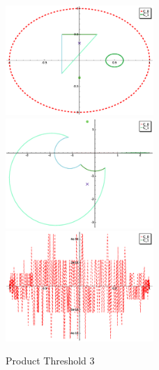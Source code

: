 \documentclass[a4paper,10pt]{article}
\begin{document}
\graphicspath{{./GE1LE0PT3/}}
\begin{figure}
\caption{Product Threshold 3}
\includegraphics[width=0.5\textwidth]{circle_plot.eps}
\includegraphics[width=0.5\textwidth]{zedplot.eps}
\includegraphics[width=0.5\textwidth]{zedplot_C0.eps}
\end{figure}
\end{document}
